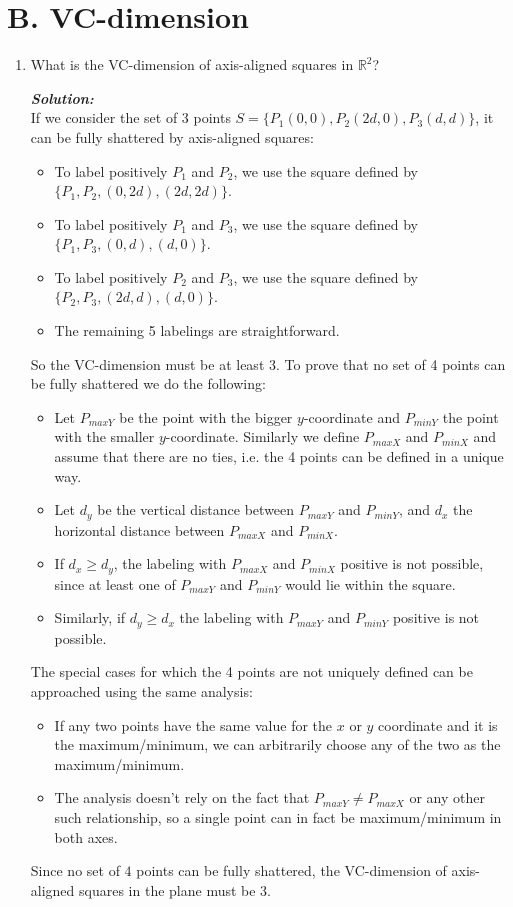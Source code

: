 \documentclass{article}
\begin{document}
\section*{B. VC-dimension}
\begin{enumerate}
\item What is the VC-dimension of axis-aligned squares in $\mathbb{R}^2$?

\textbf{\emph{Solution:}}\\
If we consider the set of 3 points $S = \{P_1(0, 0), P_2(2d, 0), P_3(d, d)\}$, it can be fully shattered by axis-aligned squares:
\begin{itemize}
    \item To label positively $P_1$ and $P_2$, we use the square defined by $\{P_1,P_2,(0,2d),(2d,2d)\}$.
    \item To label positively $P_1$ and $P_3$, we use the square defined by $\{P_1,P_3,(0,d),(d,0)\}$.
    \item To label positively $P_2$ and $P_3$, we use the square defined by $\{P_2,P_3,(2d,d),(d,0)\}$.
    \item The remaining 5 labelings are straightforward.
\end{itemize}
So the VC-dimension must be at least 3. To prove that no set of 4 points can be fully shattered we do the following:
\begin{itemize}
    \item Let $P_{maxY}$ be the point with the bigger $y$-coordinate and $P_{minY}$ the point with the smaller $y$-coordinate. Similarly we define $P_{maxX}$ and $P_{minX}$ and assume that there are no ties, i.e. the 4 points can be defined in a unique way.
    \item Let $d_y$ be the vertical distance between $P_{maxY}$ and $P_{minY}$, and $d_x$ the horizontal distance between $P_{maxX}$ and $P_{minX}$.
    \item If $d_x \geq d_y$, the labeling with $P_{maxX}$ and $P_{minX}$ positive is not possible, since at least one of $P_{maxY}$ and $P_{minY}$ would lie within the square.
    \item Similarly, if $d_y \geq d_x$ the labeling with $P_{maxY}$ and $P_{minY}$ positive is not possible.
\end{itemize}
The special cases for which the 4 points are not uniquely defined can be approached using the same analysis:
\begin{itemize}
    \item If any two points have the same value for the $x$ or $y$ coordinate and it is the maximum/minimum, we can arbitrarily choose any of the two as the maximum/minimum.
    \item The analysis doesn't rely on the fact that $P_{maxY} \neq P_{maxX}$ or any other such relationship, so a single point can in fact be maximum/minimum in both axes.
\end{itemize}
Since no set of $4$ points can be fully shattered, the VC-dimension of axis-aligned squares in the plane must be 3.


\end{enumerate}
\end{document}

